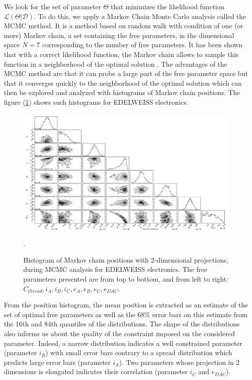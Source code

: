We look for the set of parameter $\Theta$ that minimizes the likelihood function $\mathcal{L}(\Theta | \mathcal{D})$. To do this, we apply a Markov Chain Monte Carlo analysis called the MCMC method. It is a method based on random walk with condition of one (or more) Markov chain, a set containing the free parameters, in the dimensional space $N=7$ corresponding to the number of free parameters. It has been shown that with a correct likelihood function, the Markov chain allows to sample this function in a neighborhood of the optimal solution . The advantages of the MCMC method are that it can probe a large part of the free parameter space but that it converges quickly to the neighborhood of the optimal solution which can then be explored and analyzed with histograms of Markov chain positions. The figure (\ref{triangle-mcmc}) shows such histograms for EDELWEISS electronics.
\begin{figure}
\includegraphics [width=\textwidth]{Images/triangle_fin.pdf}
\caption{Histogram of Markov chain positions with 2-dimensional projections, during MCMC analysis for EDELWEISS electronics. The free parameters presented are from top to bottom, and from left to right: $C_{thread}, i_A, i_B, i_C, e_A, e_B, e_C, e_{DAC}$.}.
\label{triangle-mcmc}
\end{figure}
From the position histogram, the mean position is extracted as an estimate of the set of optimal free parameters as well as the $68\%$ error bars on this estimate from the 16th and 84th quantiles of the distributions. The shape of the distributions also informs us about the quality of the constraint imposed on the considered parameter. Indeed, a narrow distribution indicates a well constrained parameter (parameter $i_B$) with small error bars contrary to a spread distribution which predicts large error bars (parameter $i_A$). Two parameters whose projection in 2 dimensions is elongated indicates their correlation (parameter $i_C$ and $e_{DAC}$). 

